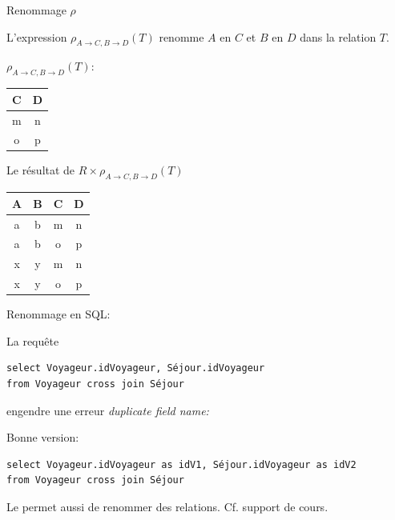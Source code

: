 \begin{frame}[fragile]{Renommage $\rho$}

L'expression $\rho_{A \to C,B \to D}(T)$ renomme 
$A$ en $C$ et $B$ en $D$ dans la relation
$T$.

\vfill

$\rho_{A\to C,B \to D}(T)$:
\begin{tabular}{c|c}
C & D \\ \hline
m & n  \\
o & p  \\\hline 
\end{tabular}

\vfill

Le résultat de $R \times \rho_{A\to C,B \to D}(T)$ 

\vfill

\begin{tabular}{c|c|c|c}
A & B & C & D \\ \hline
a & b & m & n  \\ 
a & b & o & p \\
x & y & m & n  \\ 
x & y & o & p \\\hline
\end{tabular}

\end{frame}



\begin{frame}[fragile]{Renommage en SQL: }


La requête
\
\vfill

\begin{verbatim}
select Voyageur.idVoyageur, Séjour.idVoyageur
from Voyageur cross join Séjour
\end{verbatim}

engendre une erreur \textit{duplicate field name:}

\vfill

Bonne version:

\begin{verbatim}
select Voyageur.idVoyageur as idV1, Séjour.idVoyageur as idV2
from Voyageur cross join Séjour
\end{verbatim}

\begin{blocgauche}
Le  permet aussi de renommer des relations. Cf. support de cours.
\end{blocgauche}

\end{frame}


